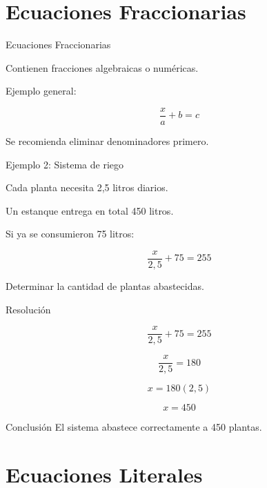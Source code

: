 \documentclass[aspectratio=169]{beamer}
\begin{document}
	\section{Ecuaciones Fraccionarias}
	
	\begin{frame}{Ecuaciones Fraccionarias}
		
		Contienen fracciones algebraicas o numéricas.
		
		Ejemplo general:
		
		\[
		\frac{x}{a} + b = c
		\]
		
		Se recomienda eliminar denominadores primero.
		
	\end{frame}
	
	\begin{frame}{Ejemplo 2: Sistema de riego}
		
		Cada planta necesita 2,5 litros diarios.
		
		Un estanque entrega en total 450 litros.
		
		Si ya se consumieron 75 litros:
		
		\[
		\frac{x}{2,5} + 75 = 255
		\]
		
		Determinar la cantidad de plantas abastecidas.
		
	\end{frame}
	
	\begin{frame}{Resolución}
		
		\[
		\frac{x}{2,5} + 75 = 255
		\]
		
		\pause
		
		\[
		\frac{x}{2,5} = 180
		\]
		
		\pause
		
		\[
		x = 180(2,5)
		\]
		
		\pause
		
		\[
		x = 450
		\]
		
		\begin{block}{Conclusión}
			El sistema abastece correctamente a 450 plantas.
		\end{block}
		
	\end{frame}
	
	\section{Ecuaciones Literales}
	
\end{document}
